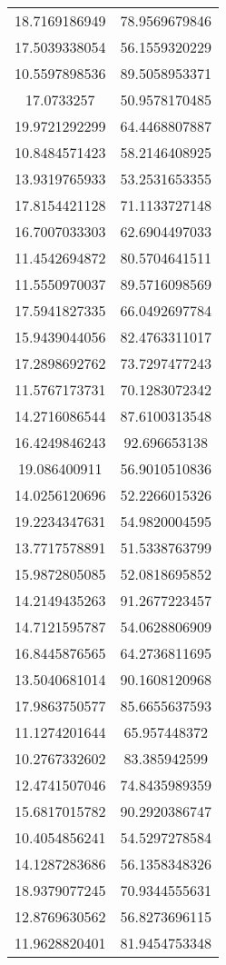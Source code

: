 \begin{table}
\begin{tabular}{cc}
18.7169186949 & 78.9569679846 \\
17.5039338054 & 56.1559320229 \\
10.5597898536 & 89.5058953371 \\
17.0733257 & 50.9578170485 \\
19.9721292299 & 64.4468807887 \\
10.8484571423 & 58.2146408925 \\
13.9319765933 & 53.2531653355 \\
17.8154421128 & 71.1133727148 \\
16.7007033303 & 62.6904497033 \\
11.4542694872 & 80.5704641511 \\
11.5550970037 & 89.5716098569 \\
17.5941827335 & 66.0492697784 \\
15.9439044056 & 82.4763311017 \\
17.2898692762 & 73.7297477243 \\
11.5767173731 & 70.1283072342 \\
14.2716086544 & 87.6100313548 \\
16.4249846243 & 92.696653138 \\
19.086400911 & 56.9010510836 \\
14.0256120696 & 52.2266015326 \\
19.2234347631 & 54.9820004595 \\
13.7717578891 & 51.5338763799 \\
15.9872805085 & 52.0818695852 \\
14.2149435263 & 91.2677223457 \\
14.7121595787 & 54.0628806909 \\
16.8445876565 & 64.2736811695 \\
13.5040681014 & 90.1608120968 \\
17.9863750577 & 85.6655637593 \\
11.1274201644 & 65.957448372 \\
10.2767332602 & 83.385942599 \\
12.4741507046 & 74.8435989359 \\
15.6817015782 & 90.2920386747 \\
10.4054856241 & 54.5297278584 \\
14.1287283686 & 56.1358348326 \\
18.9379077245 & 70.9344555631 \\
12.8769630562 & 56.8273696115 \\
11.9628820401 & 81.9454753348 \\

\end{tabular}
\end{table}
